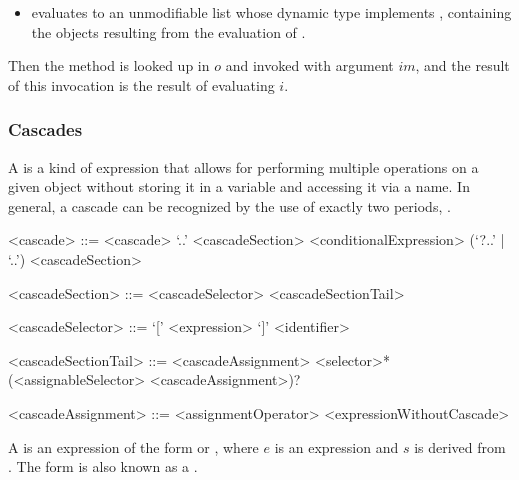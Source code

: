 \documentclass[makeidx]{article}
\begin{document}
{\begin{itemize}
  .
\item {} evaluates to an unmodifiable list
  whose dynamic type implements ,
  containing the objects resulting from the evaluation of
  .
\end{itemize}

\LMHash{}%
Then the method  is looked up in $o$ and
invoked with argument $im$,
and the result of this invocation is the result of evaluating $i$.

\EndCase


\subsubsection{Cascades}

\LMHash{}%
A  is a kind of expression that allows for performing
multiple operations on a given object
without storing it in a variable and accessing it via a name.
In general, a cascade can be recognized by the use of exactly two periods,
.

\begin{grammar}
<cascade> ::= <cascade> `..' <cascadeSection>
  \alt <conditionalExpression> (`?..' | `..') <cascadeSection>

<cascadeSection> ::= <cascadeSelector> <cascadeSectionTail>

<cascadeSelector> ::= `[' <expression> `]'
  \alt <identifier>

<cascadeSectionTail> ::= <cascadeAssignment>
  \alt <selector>* (<assignableSelector> <cascadeAssignment>)?

<cascadeAssignment> ::= <assignmentOperator> <expressionWithoutCascade>
\end{grammar}

\LMHash{}%
A 
is an expression of the form
 or ,
where $e$ is an expression
and $s$ is derived from .
The form
is also known as a
.


}
\end{document}
